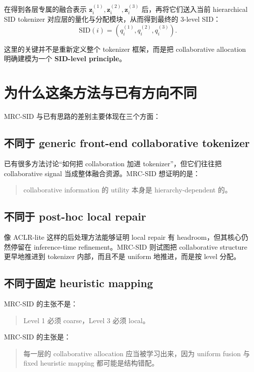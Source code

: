 \documentclass[11pt]{article}
\begin{document}
在得到各层专属的融合表示 $\mathbf{z}_i^{(1)}, \mathbf{z}_i^{(2)}, \mathbf{z}_i^{(3)}$ 后，再将它们送入当前 hierarchical SID tokenizer 对应层的量化与分配模块，从而得到最终的 3-level SID：
\[
\text{SID}(i) = \left(q_i^{(1)}, q_i^{(2)}, q_i^{(3)}\right).
\]

这里的关键并不是重新定义整个 tokenizer 框架，而是把 collaborative allocation 明确建模为一个 \textbf{SID-level principle}。

\section{为什么这条方法与已有方向不同}

MRC-SID 与已有思路的差别主要体现在三个方面：

\subsection{不同于 generic front-end collaborative tokenizer}

已有很多方法讨论“如何把 collaboration 加进 tokenizer”，但它们往往把 collaborative signal 当成整体融合资源。MRC-SID 想证明的是：
\begin{quote}
collaborative information 的 utility 本身是 hierarchy-dependent 的。
\end{quote}

\subsection{不同于 post-hoc local repair}

像 ACLR-lite 这样的后处理方法能够证明 local repair 有 headroom，但其核心仍然停留在 inference-time refinement。MRC-SID 则试图把 collaborative structure 更早地推进到 tokenizer 内部，而且不是 uniform 地推进，而是按 level 分配。

\subsection{不同于固定 heuristic mapping}

MRC-SID 的主张不是：
\begin{quote}
Level 1 必须 coarse，Level 3 必须 local。
\end{quote}

MRC-SID 的主张是：
\begin{quote}
每一层的 collaborative allocation 应当被学习出来，因为 uniform fusion 与 fixed heuristic mapping 都可能是结构错配。
\end{quote}
\end{document}
